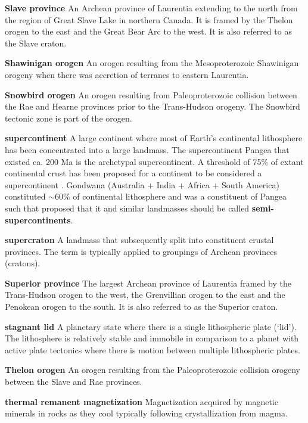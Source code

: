 \documentclass[twocolumn, switch]{article} %
\begin{document}
\noindent\textbf{Slave province } An Archean province of Laurentia extending to the north from the region of Great Slave Lake in northern Canada. It is framed by the Thelon orogen to the east and the Great Bear Arc to the west. It is also referred to as the Slave craton.

\noindent\textbf{Shawinigan orogen } An orogen resulting from the Mesoproterozoic Shawinigan orogeny when there was accretion of terranes to eastern Laurentia.

\noindent\textbf{Snowbird orogen } An orogen resulting from Paleoproterozoic collision between the Rae and Hearne provinces prior to the Trans-Hudson orogeny. The Snowbird tectonic zone is part of the orogen.

\noindent\textbf{supercontinent } A large continent where most of Earth's continental lithosphere has been concentrated into a large landmass. The supercontinent Pangea that existed ca. 200 Ma is the archetypal supercontinent. A threshold of 75$\%$ of extant continental crust has been proposed for a continent to be considered a supercontinent \citep{Meert2012a}.  Gondwana (Australia + India + Africa + South America) constituted $\sim$60$\%$ of continental lithosphere and was a constituent of Pangea such that \cite{Evans2016a} proposed that it and similar landmasses should be called \textbf{semi-supercontinents}.

\noindent\textbf{supercraton } A landmass that subsequently split into constituent crustal provinces. The term is typically applied to groupings of Archean provinces (cratons).

\noindent\textbf{Superior province } The largest Archean province of Laurentia framed by the Trans-Hudson orogen to the west, the Grenvillian orogen to the east and the Penokean orogen to the south. It is also referred to as the Superior craton.

\noindent\textbf{stagnant lid } A planetary state where there is a single lithospheric plate (`lid'). The lithosphere is relatively stable and immobile in comparison to a planet with active plate tectonics where there is motion between multiple lithospheric plates. 

\noindent\textbf{Thelon orogen } An orogen resulting from the Paleoproterozoic collision orogeny between the Slave and Rae provinces.

\noindent\textbf{thermal remanent magnetization } Magnetization acquired by magnetic minerals in rocks as they cool typically following crystallization from magma.
\end{document}
